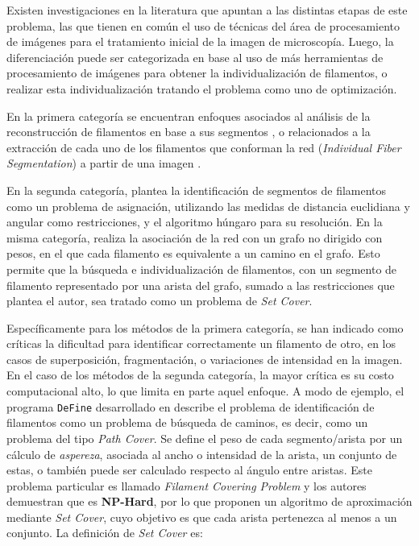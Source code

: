\documentclass{article}
\begin{document}
Existen investigaciones en la literatura que apuntan a las distintas etapas de este problema, las que tienen en com\'un el uso de t\'ecnicas del \'area de procesamiento de im\'agenes para el tratamiento inicial de la imagen de microscop\'ia. Luego, la diferenciaci\'on puede ser categorizada en base al uso de m\'as herramientas de procesamiento de im\'agenes para obtener la individualizaci\'on de filamentos, o realizar esta individualizaci\'on tratando el problema como uno de optimizaci\'on. 

\medskip
En la primera categor\'ia se encuentran enfoques asociados al an\'alisis de la reconstrucci\'on de filamentos en base a sus segmentos \cite{zhang2017extracting}, o relacionados a la extracci\'on de cada uno de los filamentos que conforman la red (\textit{Individual Fiber Segmentation}) a partir de una imagen \cite{doi:10.1021/ma502264c}\cite{boudaoud2014fibriltool}\cite{lichtenstein2003quantitative}\cite{alioscha2016robust}.

En la segunda categor\'ia, \cite{cerda2014geometrical} plantea la identificaci\'on de segmentos de filamentos como un problema de asignaci\'on, utilizando las medidas de distancia euclidiana y angular como restricciones, y el algoritmo h\'ungaro para su resoluci\'on. En la misma categor\'ia, \cite{breuer2015define} realiza la asociaci\'on de la red con un grafo no dirigido con pesos, en el que cada filamento es equivalente a un camino en el grafo. Esto permite que la b\'usqueda e individualizaci\'on de filamentos, con un segmento de filamento representado por una arista del grafo, sumado a las restricciones que plantea el autor, sea tratado como un problema de {\it Set Cover}.

\medskip
Espec\'ificamente para los m\'etodos de la primera categor\'ia, se han indicado como cr\'iticas la dificultad para identificar correctamente un filamento de otro, en los casos de  superposici\'on, fragmentaci\'on, o variaciones de intensidad en la imagen.
En el caso de los m\'etodos de la segunda categor\'ia, la mayor cr\'itica es su costo computacional alto, lo que limita en parte aquel enfoque. A modo de ejemplo, el programa \texttt{DeFine} desarrollado en \cite{breuer2015define} describe el problema de identificaci\'on de filamentos como un problema de b\'usqueda de caminos, es decir, como un problema del tipo {\it Path Cover}. Se define el peso de cada segmento/arista por un c\'alculo de {\it aspereza}, asociada al ancho o intensidad de la arista, un conjunto de estas, o tambi\'en puede ser calculado respecto al \'angulo entre aristas.
Este problema particular es llamado {\it Filament Covering Problem} y los autores demuestran que es \textbf{NP-Hard}, por lo que proponen un algoritmo de aproximaci\'on mediante \textit{Set Cover}, cuyo objetivo es que cada arista pertenezca al menos a un conjunto. La definici\'on de {\it Set Cover} es:
\end{document}
